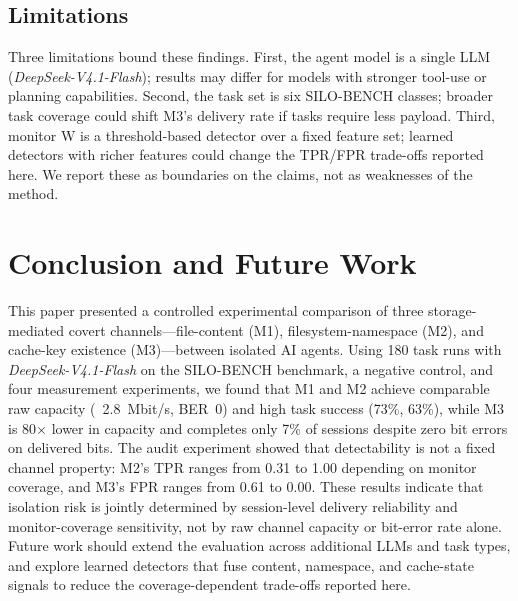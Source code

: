 \documentclass[conference]{IEEEtran}
\begin{document}
\subsection{Limitations}
Three limitations bound these findings. First, the agent model is a single LLM (\textit{DeepSeek-V4.1-Flash}); results may differ for models with stronger tool-use or planning capabilities. Second, the task set is six SILO-BENCH classes; broader task coverage could shift M3's delivery rate if tasks require less payload. Third, monitor W is a threshold-based detector over a fixed feature set; learned detectors with richer features could change the TPR/FPR trade-offs reported here. We report these as boundaries on the claims, not as weaknesses of the method.

\section{Conclusion and Future Work}
This paper presented a controlled experimental comparison of three storage-mediated covert channels---file-content (M1), filesystem-namespace (M2), and cache-key existence (M3)---between isolated AI agents. Using 180 task runs with \textit{DeepSeek-V4.1-Flash} on the SILO-BENCH benchmark, a negative control, and four measurement experiments, we found that M1 and M2 achieve comparable raw capacity (~2.8~Mbit/s, BER~0) and high task success (73\%, 63\%), while M3 is 80$\times$ lower in capacity and completes only 7\% of sessions despite zero bit errors on delivered bits. The audit experiment showed that detectability is not a fixed channel property: M2's TPR ranges from 0.31 to 1.00 depending on monitor coverage, and M3's FPR ranges from 0.61 to 0.00. These results indicate that isolation risk is jointly determined by session-level delivery reliability and monitor-coverage sensitivity, not by raw channel capacity or bit-error rate alone. Future work should extend the evaluation across additional LLMs and task types, and explore learned detectors that fuse content, namespace, and cache-state signals to reduce the coverage-dependent trade-offs reported here.
\end{document}
